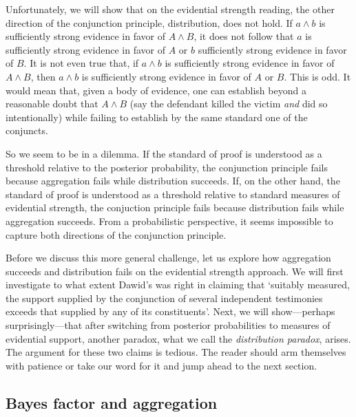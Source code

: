 \documentclass[
  10pt,
  dvipsnames,enabledeprecatedfontcommands]{scrartcl}
\begin{document}
Unfortunately, we will show that on the evidential strength reading, the
other direction of the conjunction principle, distribution, does not
hold. If \(a \wedge b\) is sufficiently strong evidence in favor of
\(A \wedge B\), it does not follow that \(a\) is sufficiently strong
evidence in favor of \(A\) or \(b\) sufficiently strong evidence in
favor of \(B\). It is not even true that, if \(a \wedge b\) is
sufficiently strong evidence in favor of \(A \wedge B\), then
\(a\wedge b\) is sufficiently strong evidence in favor of \(A\) or
\(B\). This is odd. It would mean that, given a body of evidence, one
can establish beyond a reasonable doubt that \(A \wedge B\) (say the
defendant killed the victim \textit{and} did so intentionally) while
failing to establish by the same standard one of the conjuncts.

So we seem to be in a dilemma. If the standard of proof is understood as
a threshold relative to the posterior probability, the conjunction
principle fails because aggregation fails while distribution succeeds.
If, on the other hand, the standard of proof is understood as a
threshold relative to standard measures of evidential strength, the
conjuction principle fails because distribution fails while aggregation
succeeds. From a probabilistic perspective, it seems impossible to
capture both directions of the conjunction principle.

Before we discuss this more general challenge, let us explore how
aggregation succeeds and distribution fails on the evidential strength
approach. We will first investigate to what extent Dawid's was right in
claiming that `suitably measured, the support supplied by the
conjunction of several independent testimonies exceeds that supplied by
any of its constituents'. Next, we will show---perhaps
surprisingly---that after switching from posterior probabilities to
measures of evidential support, another paradox, what we call the
\textit{distribution paradox}, arises. The argument for these two claims
is tedious. The reader should arm themselves with patience or take our
word for it and jump ahead to the next section.


\hypertarget{bayes-factor-and-aggregation}{%
\subsection{Bayes factor and
aggregation}\label{bayes-factor-and-aggregation}}
\end{document}

